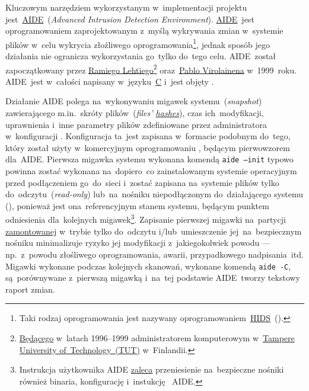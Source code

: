 \documentclass[thesis]{subfiles}
\begin{document}
Kluczowym narzędziem wykorzystanym w~implementacji projektu jest~\href{http://aide.sourceforge.net/}{AIDE}~(\emph{Advanced Intrusion Detection Environment}). \href{https://wiki.archlinux.org/index.php/AIDE}{AIDE}~jest oprogramowaniem zaprojektowanym z~myślą wykrywania zmian w~systemie plików w~celu wykrycia złoźliwego oprogramowania\footnote{Taki rodzaj oprogramowania jest nazywany oprogramowaniem~\href{https://en.wikipedia.org/wiki/Host-based_intrusion_detection_system_comparison}{HIDS}~().}, jednak sposób jego działania nie ogranicza wykorzystania go~tylko do~tego celu. AIDE~został zapoczątkowany przez \href{http://www.ipi.fi/~rammer/cv.html}{Ramiego Lehtiego}\footnote{\href{http://www.ipi.fi/~rammer/cv.html}{Będącego} w~latach 1996--1999 administratorem komputerowym w~\href{http://www.tut.fi/en}{Tampere University of~Technology~(TUT)} w~Finlandii.} oraz~\href{https://www.linkedin.com/in/pablo-virolainen-73501731/}{Pablo Virolainena} w~1999~roku. AIDE~jest w~całości napisany w~języku~\href{https://en.wikipedia.org/wiki/C_(programming_language)}{C} i~jest objęty .

Działanie AIDE polega na~wykonywaniu migawek systemu~(\emph{snapshot}) zawierającego m.in.~skróty plików~(\emph{files' \href{https://en.wikipedia.org/wiki/Hash_function}{hashes}}), czas ich~modyfikacji, uprawnienia i~inne parametry plików zdefiniowane przez administratora w~konfiguracji . Konfiguracja ta~jest zapisana w~formacie podobnym do~tego, który został użyty w~komercyjnym oprogramowaniu , będącym pierwowzorem dla~AIDE. Pierwsza migawka systemu wykonana komendą \texttt{aide --init} typowo powinna zostać wykonana na~dopiero~co zainstalowanym systemie operacyjnym przed podłączeniem go~do~sieci i~zostać zapisana na~systemie plików tylko do~odczytu~(\emph{read-only}) lub~na~nośniku niepodłączonym do~działającego systemu (), ponieważ jest ona~referencyjnym stanem systemu, będącym punktem odniesienia dla~kolejnych migawek\footnote{Instrukcja użytkownika AIDE \href{http://aide.sourceforge.net/stable/manual.html\#usage}{zaleca} przeniesienie na~bezpieczne nośniki również binaria, konfigurację i~instukcję ~AIDE.}. Zapisanie pierwszej migawki na~partycji \href{https://linux.die.net/man/8/mount}{zamontowanej} w~trybie tylko do~odczytu i/lub~umieszczenie jej~na~bezpiecznym nośniku minimalizuje ryzyko jej modyfikacji z~jakiegokolwiek powodu --- np.~z~powodu złośliwego oprogramowania, awarii, przypadkowego nadpisania~itd. Migawki wykonane podczas kolejnych skanowań, wykonane komendą \texttt{aide~-C}, są~porównywane z~pierwszą migawką i~na~tej podstawie AIDE~tworzy tekstowy raport zmian.
\end{document}
